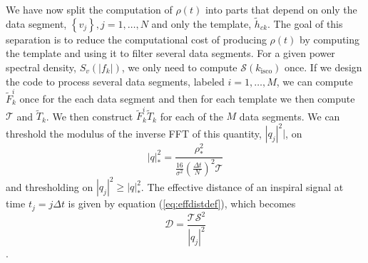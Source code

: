 We have now split the computation of $\rho(t)$ into parts that depend on only
the data segment, $\left\{v_j\right\}, j = 1,\ldots,N$ and only the template,
$\tilde{h}_{ck}$. The goal of this separation is to reduce the computational
cost of producing $\rho(t)$ by computing the template and using it to filter
several data segments. For a given power spectral density, $S_v(|f_k|)$, we
only need to compute $\mathcal{S}(k_\mathrm{isco})$ once. If we design the
code to process several data segments, labeled $i = 1,\ldots,M$, we can
compute $\tilde{F}_k^i$ once for the each data segment and then for each
template we then compute $\mathcal{T}$ and $\tilde{T}_k$. We then construct
$\tilde{F}_k^i\tilde{T}_k$ for each of the $M$ data segments. We can threshold
the modulus of the inverse FFT of this quantity, $|q_j|^2|$, on
\begin{equation}
|q|^2_\ast = \frac{\rho^2_\ast} 
{\frac{16}{\sigma^2}\left(\frac{\Delta t}{N}\right)^2 \mathcal{T}}
\end{equation}
and thresholding on $|q_j|^2 \ge |q|^2_\ast$. The effective distance of an
inspiral signal at time $t_j = j\Delta t$ is given by equation
(\ref{eq:effdistdef}), which becomes
\begin{equation}
\mathcal{D} = \frac{\mathcal{T}\mathcal{S}^2}{|q_j|^2}
\end{equation}.

